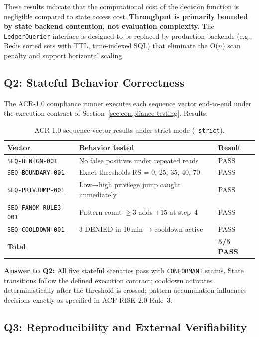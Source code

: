 \documentclass[11pt]{article}
\theoremstyle{definition}
\begin{document}
These results indicate that the computational cost of the decision function is negligible
compared to state access cost.
\textbf{Throughput is primarily bounded by state backend contention, not evaluation complexity.}
The \texttt{LedgerQuerier} interface is designed to be replaced by production backends
(e.g., Redis sorted sets with TTL, time-indexed SQL) that eliminate the O($n$) scan penalty
and support horizontal scaling.

\subsection{Q2: Stateful Behavior Correctness}

The ACR-1.0 compliance runner executes each sequence vector end-to-end under the execution contract of Section~\ref{sec:compliance-testing}.
Results:

\begin{table}[h!]
\centering
\small
\begin{tabular}{@{}lll@{}}
\toprule
\textbf{Vector} & \textbf{Behavior tested} & \textbf{Result} \\
\midrule
\texttt{SEQ-BENIGN-001}      & No false positives under repeated reads    & PASS \\
\texttt{SEQ-BOUNDARY-001}    & Exact thresholds RS = 0, 25, 35, 40, 70   & PASS \\
\texttt{SEQ-PRIVJUMP-001}    & Low→high privilege jump caught immediately & PASS \\
\texttt{SEQ-FANOM-RULE3-001} & Pattern count $\geq 3$ adds $+15$ at step~4 & PASS \\
\texttt{SEQ-COOLDOWN-001}    & 3 DENIED in 10\,min → cooldown active      & PASS \\
\midrule
\textbf{Total} & & \textbf{5/5 PASS} \\
\bottomrule
\end{tabular}
\caption{ACR-1.0 sequence vector results under strict mode (\texttt{--strict}).}
\end{table}

\noindent\textbf{Answer to Q2:}
All five stateful scenarios pass with \texttt{CONFORMANT} status.
State transitions follow the defined execution contract; cooldown activates deterministically after the threshold is crossed;
pattern accumulation influences decisions exactly as specified in ACP-RISK-2.0 Rule~3.

\subsection{Q3: Reproducibility and External Verifiability}
\end{document}

